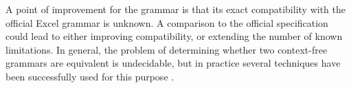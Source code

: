 \documentclass[times]{smrauth}
\begin{document}
A point of improvement for the grammar is that its exact compatibility with the official Excel grammar is unknown.
A comparison to the official specification could lead to either improving compatibility, or extending the number of known limitations.
In general, the problem of determining whether two context-free grammars are equivalent is undecidable, but in practice several techniques have been successfully used for this purpose \cite{lammel2009introduction,fischer2012comparison}.



\end{document}
